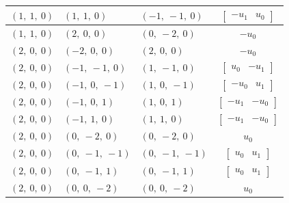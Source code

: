 \documentclass[11pt]{article}
\theoremstyle{definition}
\begin{document}
\begin{longtable}{|l|l|l|c|}
    \hline
    $\left( 1, \  1, \  0\right)$ & $\left( 1, \  1, \  0\right)$ & $\left( -1, \  -1, \  0\right)$ & $\left[\begin{matrix}- u_{1} & u_{0}\end{matrix}\right]$ \\
    \hline
    $\left( 1, \  1, \  0\right)$ & $\left( 2, \  0, \  0\right)$ & $\left( 0, \  -2, \  0\right)$ & $- u_{0}$ \\
    \hline
    $\left( 2, \  0, \  0\right)$ & $\left( -2, \  0, \  0\right)$ & $\left( 2, \  0, \  0\right)$ & $- u_{0}$ \\
    \hline
    $\left( 2, \  0, \  0\right)$ & $\left( -1, \  -1, \  0\right)$ & $\left( 1, \  -1, \  0\right)$ & $\left[\begin{matrix}u_{0} & - u_{1}\end{matrix}\right]$ \\
    \hline
    $\left( 2, \  0, \  0\right)$ & $\left( -1, \  0, \  -1\right)$ & $\left( 1, \  0, \  -1\right)$ & $\left[\begin{matrix}- u_{0} & u_{1}\end{matrix}\right]$ \\
    \hline
    $\left( 2, \  0, \  0\right)$ & $\left( -1, \  0, \  1\right)$ & $\left( 1, \  0, \  1\right)$ & $\left[\begin{matrix}- u_{1} & - u_{0}\end{matrix}\right]$ \\
    \hline
    $\left( 2, \  0, \  0\right)$ & $\left( -1, \  1, \  0\right)$ & $\left( 1, \  1, \  0\right)$ & $\left[\begin{matrix}- u_{1} & - u_{0}\end{matrix}\right]$ \\
    \hline
    $\left( 2, \  0, \  0\right)$ & $\left( 0, \  -2, \  0\right)$ & $\left( 0, \  -2, \  0\right)$ & $u_{0}$ \\
    \hline
    $\left( 2, \  0, \  0\right)$ & $\left( 0, \  -1, \  -1\right)$ & $\left( 0, \  -1, \  -1\right)$ & $\left[\begin{matrix}u_{0} & u_{1}\end{matrix}\right]$ \\
    \hline
    $\left( 2, \  0, \  0\right)$ & $\left( 0, \  -1, \  1\right)$ & $\left( 0, \  -1, \  1\right)$ & $\left[\begin{matrix}u_{0} & u_{1}\end{matrix}\right]$ \\
    \hline
    $\left( 2, \  0, \  0\right)$ & $\left( 0, \  0, \  -2\right)$ & $\left( 0, \  0, \  -2\right)$ & $u_{0}$ \\

\end{longtable}
\end{document}

